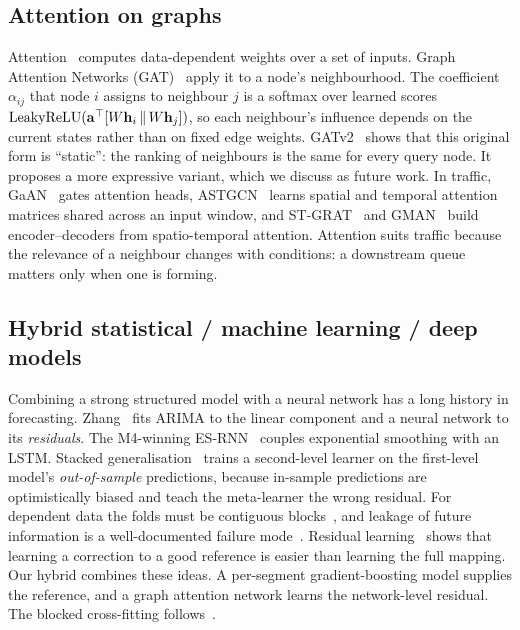 \subsection{Attention on graphs}
Attention~\cite{bahdanau2015,vaswani2017} computes data-dependent weights over a
set of inputs. Graph Attention Networks (GAT)~\cite{velickovic2018gat} apply it to
a node's neighbourhood. The coefficient $\alpha_{ij}$ that node $i$ assigns to
neighbour $j$ is a softmax over learned scores
$\operatorname{LeakyReLU}(\mathbf{a}^\top[W\mathbf{h}_i\,\|\,W\mathbf{h}_j])$, so each
neighbour's influence depends on the current states rather than on fixed edge weights.
GATv2~\cite{brody2022gatv2} shows that this original form is ``static'': the ranking
of neighbours is the same for every query node. It proposes a more expressive
variant, which we discuss as future work. In traffic, GaAN~\cite{zhang2018gaan}
gates attention heads, ASTGCN~\cite{guo2019astgcn} learns spatial and temporal
attention matrices shared across an input window, and ST-GRAT~\cite{park2020stgrat}
and GMAN~\cite{zheng2020gman} build encoder--decoders from spatio-temporal attention.
Attention suits traffic because the relevance of a neighbour changes with
conditions: a downstream queue matters only when one is forming.

\subsection{Hybrid statistical / machine learning / deep models}
Combining a strong structured model with a neural network has a long history in
forecasting. Zhang~\cite{zhang2003hybrid} fits ARIMA to the linear component and
a neural network to its \emph{residuals}. The M4-winning ES-RNN~\cite{smyl2020esrnn}
couples exponential smoothing with an LSTM. Stacked
generalisation~\cite{wolpert1992stacking} trains a second-level learner on the
first-level model's \emph{out-of-sample} predictions, because in-sample predictions
are optimistically biased and teach the meta-learner the wrong residual. For
dependent data the folds must be contiguous blocks~\cite{bergmeir2012cv}, and
leakage of future information is a well-documented failure
mode~\cite{kaufman2012leakage}. Residual learning~\cite{he2016resnet} shows that
learning a correction to a good reference is easier than learning the full mapping.
Our hybrid combines these ideas. A per-segment gradient-boosting model supplies the
reference, and a graph attention network learns the network-level residual. The
blocked cross-fitting follows~\cite{bergmeir2012cv,wolpert1992stacking}.

